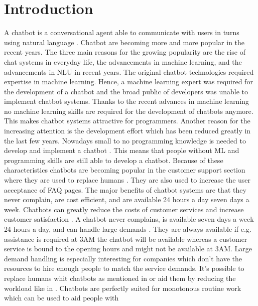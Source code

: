 
\section{Introduction} %
A chatbot is a conversational agent able to communicate with users in turns 
using natural language \cite{evaluateChatbotsShawar2007, shawar2007chatbots, huang2007extracting, gregori2017evaluation}.
Chatbot are becoming more and more popular in the recent years.
The three main reasons for the growing popularity are the rise of chat systems in everyday life, 
the advancements in machine learning, and the advancements in NLU in recent years. \cite{braunEvaluatingNLU}
The original chatbot technologies required expertise in machine learning.
Hence, a machine learning expert was required for the development of a chatbot and the broad public 
of developers was unable to implement chatbot systems.
Thanks to the recent advances in machine learning no machine learning skills are required for the development of chatbots anymore.
This makes chatbot systems attractive for programmers. 
Another reason for the increasing attention is the development effort which has been reduced greatly in the last few years.
Nowadays small to no programming knowledge is needed to develop and implement a chatbot \cite{braunEvaluatingNLU}.
This means that people without ML and programming skills are still able to develop a chatbot.
Because of these characteristics chatbots are becoming popular in the customer support section where they are used to replace humans \cite{GO2019304}.
They are also used to increase the user acceptance of FAQ pages.
The major benefits of chatbot systems are that they never complain, are cost efficient, and are available 24 hours a day
seven days a week.
Chatbots can greatly reduce the costs of customer services and increase customer satisfaction \cite{singhbuilding}. 
A chatbot never complains, is available seven days a week 24 hours a day, and can handle large 
demands \cite{singhbuilding}.
They are always available if e.g. assistance is required at 3AM the chatbot will be available whereas a 
customer service is bound to the opening hours and might not be available at 3AM.
Large demand handling is especially interesting for companies which don't have the resources to 
hire enough people to match the service demands.
It's possible to replace humans whit chatbots as mentioned in \citet{rahman2017programming}
or aid them by reducing the workload like in \citet{deshpande2017survey}.
Chatbots are perfectly suited for monotonous routine work which can be used to aid people with 
